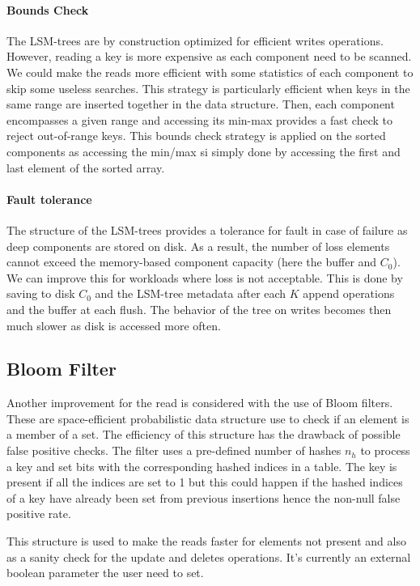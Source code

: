 \documentclass{sig-alternate-05-2015}
\begin{document}
\paragraph{Bounds Check}

The LSM-trees are by construction optimized for efficient writes operations. However, reading a key is more expensive as each component need to be scanned. We could make the reads more efficient with some statistics of each component to skip some useless searches. This strategy is particularly efficient when keys in the same range are inserted together in the data structure. Then, each component encompasses a given range and accessing its min-max provides a fast check to reject out-of-range keys. This bounds check strategy is applied on the sorted components as accessing the min/max si simply done by accessing the first and last element of the sorted array.

\paragraph{Fault tolerance}

The structure of the LSM-trees provides a tolerance for fault in case of failure as deep components are stored on disk. As a result, the number of loss elements cannot exceed the memory-based component capacity (here the buffer and $C_0$). We can improve this for workloads where loss is not acceptable. This is done by saving to disk $C_0$ and the LSM-tree metadata after each $K$ append operations and the buffer at each flush. The behavior of the tree on writes becomes then much slower as disk is accessed more often.

\subsection{Bloom Filter}

Another improvement for the read is considered with the use of Bloom filters. These are space-efficient probabilistic data structure use to check if an element is a member of a set. The efficiency of this structure has the drawback of possible false positive checks. The filter uses a pre-defined number of hashes $n_h$ to process a key and set bits with the corresponding hashed indices in a table. The key is present if all the indices are set to 1 but this could happen if the hashed indices of a key have already been set from previous insertions hence the non-null false positive rate.

This structure is used to make the reads faster for elements not present and also as a sanity check for the update and deletes operations. It's currently an external boolean parameter the user need to set.
\end{document}
